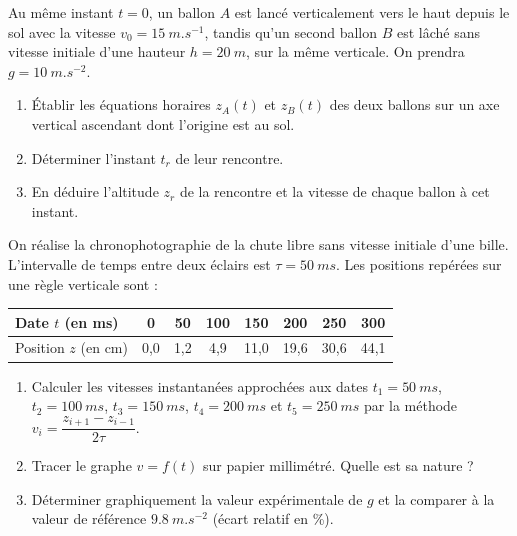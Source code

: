 \documentclass[11pt]{article}
\newcounter{popsec}
\newcounter{popsub}
\newcommand{\courssub}[1]{%
  \stepcounter{popsub}%
  \par\vspace{9pt}\noindent{\popxbold\fontsize{11.5}{13}\selectfont\color{popink}{\color{poporange}\thepopsec.\thepopsub}\hspace{6pt}#1}\par\nopagebreak\vspace{4pt}
}
\begin{document}
\courssub{Je m'entraîne}

\begin{exercice}
Au même instant $t = 0$, un ballon $A$ est lancé verticalement vers le haut depuis le sol avec la vitesse $v_0 = \SI{15}{m.s^{-1}}$, tandis qu'un second ballon $B$ est lâché sans vitesse initiale d'une hauteur $h = \SI{20}{m}$, sur la même verticale. On prendra $g = \SI{10}{m.s^{-2}}$.
\begin{enumerate}
\item Établir les équations horaires $z_A(t)$ et $z_B(t)$ des deux ballons sur un axe vertical ascendant dont l'origine est au sol.
\item Déterminer l'instant $t_r$ de leur rencontre.
\item En déduire l'altitude $z_r$ de la rencontre et la vitesse de chaque ballon à cet instant.
\end{enumerate}
\end{exercice}

\begin{exercice}
On réalise la chronophotographie de la chute libre sans vitesse initiale d'une bille. L'intervalle de temps entre deux éclairs est $\tau = \SI{50}{ms}$. Les positions repérées sur une règle verticale sont :

\begin{center}
\begin{tabular}{|l|c|c|c|c|c|c|c|}
\hline
\rowcolor{popblueL} Date $t$ (en ms) & 0 & 50 & 100 & 150 & 200 & 250 & 300 \\
\hline
Position $z$ (en cm) & 0,0 & 1,2 & 4,9 & 11,0 & 19,6 & 30,6 & 44,1 \\
\hline
\end{tabular}
\end{center}

\begin{enumerate}
\item Calculer les vitesses instantanées approchées aux dates $t_1 = \SI{50}{ms}$, $t_2 = \SI{100}{ms}$, $t_3 = \SI{150}{ms}$, $t_4 = \SI{200}{ms}$ et $t_5 = \SI{250}{ms}$ par la méthode $v_i = \dfrac{z_{i+1}-z_{i-1}}{2\tau}$.
\item Tracer le graphe $v = f(t)$ sur papier millimétré. Quelle est sa nature ?
\item Déterminer graphiquement la valeur expérimentale de $g$ et la comparer à la valeur de référence $\SI{9,8}{m.s^{-2}}$ (écart relatif en \%).
\end{enumerate}
\end{exercice}
\end{document}
